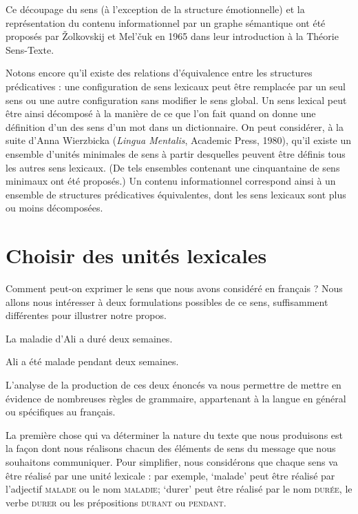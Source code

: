 {    Ce découpage du sens (à l’exception de la structure émotionnelle) et la représentation du contenu informationnel par un graphe sémantique ont été proposés par Žolkovskij et Mel’čuk en 1965 dans leur introduction à la Théorie Sens-Texte.

    Notons encore qu’il existe des relations d’équivalence entre les structures prédicatives : une configuration de sens lexicaux peut être remplacée par un seul sens ou une autre configuration sans modifier le sens global. Un sens lexical peut être ainsi décomposé à la manière de ce que l’on fait quand on donne une définition d’un des sens d’un mot dans un dictionnaire. On peut considérer, à la suite d’Anna Wierzbicka (\textit{Lingua Mentalis}, Academic Press, 1980), qu’il existe un ensemble d’unités minimales de sens à partir desquelles peuvent être définis tous les autres sens lexicaux. (De tels ensembles contenant une cinquantaine de sens minimaux ont été proposés.) Un contenu informationnel correspond ainsi à un ensemble de structures prédicatives équivalentes, dont les sens lexicaux sont plus ou moins décomposées.
}
\section{Choisir des unités lexicales}\label{sec:1.2.5}

Comment peut-on exprimer le sens que nous avons considéré en français ? Nous allons nous intéresser à deux formulations possibles de ce sens, suffisamment différentes pour illustrer notre propos.

\ea%
    \label{ex:key:1}

          La maladie d’Ali a duré deux semaines.
\z

\ea%
    \label{ex:key:2}

           Ali a été malade pendant deux semaines.
\z

L’analyse de la production de ces deux énoncés va nous permettre de mettre en évidence de nombreuses règles de grammaire, appartenant à la langue en général ou spécifiques au français.

La première chose qui va déterminer la nature du texte que nous produisons est la façon dont nous réalisons chacun des éléments de sens du message que nous souhaitons communiquer. Pour simplifier, nous considérons que chaque sens va être réalisé par une unité lexicale : par exemple, ‘malade’ peut être réalisé par l’adjectif \textsc{malade} ou le nom \textsc{maladie}; ‘durer’ peut être réalisé par le nom \textsc{durée}, le verbe \textsc{durer} ou les prépositions \textsc{durant} ou \textsc{pendant}.

